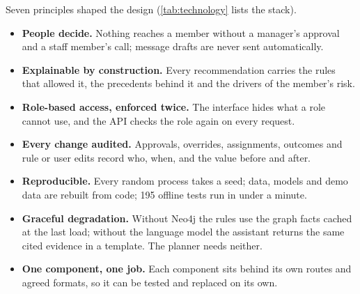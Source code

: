 Seven principles shaped the design (\cref{tab:technology} lists the stack).
\begin{itemize}
  \item \textbf{People decide.} Nothing reaches a member without a manager's approval and a staff member's call; message drafts are never sent automatically.
  \item \textbf{Explainable by construction.} Every recommendation carries the rules that allowed it, the precedents behind it and the drivers of the member's risk.
  \item \textbf{Role-based access, enforced twice.} The interface hides what a role cannot use, and the API checks the role again on every request.
  \item \textbf{Every change audited.} Approvals, overrides, assignments, outcomes and rule or user edits record who, when, and the value before and after.
  \item \textbf{Reproducible.} Every random process takes a seed; data, models and demo data are rebuilt from code; 195 offline tests run in under a minute.
  \item \textbf{Graceful degradation.} Without Neo4j the rules use the graph facts cached at the last load; without the language model the assistant returns the same cited evidence in a template. The planner needs neither.
  \item \textbf{One component, one job.} Each component sits behind its own routes and agreed formats, so it can be tested and replaced on its own.
\end{itemize}

